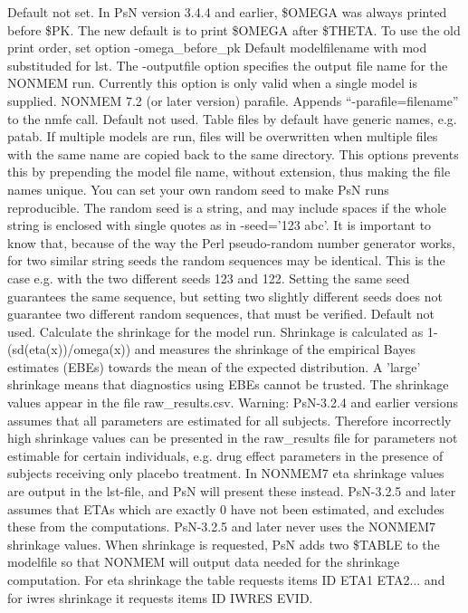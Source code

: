 \begin{optionlist}
\nextopt
{}
Default not set. In PsN version 3.4.4 and earlier, \$OMEGA was always printed before \$PK. The new default is to print \$OMEGA after \$THETA. To use the old print order, set option -omega\_before\_pk 
\nextopt
{}
Default modelfilename with mod substituded for lst. The -outputfile option specifies the output file name for the NONMEM run. Currently this option is only valid when a single model is supplied. 
\nextopt
{}
NONMEM 7.2 (or later version) parafile. Appends “-parafile=filename” to the nmfe call. 
\nextopt
{}
Default not used. Table files by default have generic names, e.g. patab. If multiple models are run, files will be overwritten when multiple files with the same name are copied back to the same directory. This options prevents this by prepending the model file name, without extension, thus making the file names unique. 
\nextopt
{}
You can set your own random seed to make PsN runs reproducible.
The random seed is a string, and may include spaces if the whole string is enclosed with single
quotes as in -seed='123 abc'. It is important to know that, because of the way the Perl pseudo-random
number generator works, for two similar string seeds the random sequences may be identical. 
This is the case e.g. with the two different seeds 123 and 122. 
Setting the same seed guarantees the same sequence, but setting two slightly different 
seeds does not guarantee two different random sequences, that must be verified.
\nextopt
{}
Default not used. Calculate the shrinkage for the model run.  Shrinkage is calculated as 1-(sd(eta(x))/omega(x)) and measures the shrinkage of the empirical Bayes estimates (EBEs) towards the mean of the expected distribution.  A 'large' shrinkage means that diagnostics using EBEs cannot be trusted. The shrinkage values appear in the file raw\_results.csv. Warning: PsN-3.2.4 and earlier versions assumes that all parameters are estimated for all subjects. Therefore incorrectly high shrinkage values can be presented in the raw\_results file for parameters not estimable for certain individuals, e.g. drug effect parameters in the presence of subjects receiving only placebo treatment. In NONMEM7 eta shrinkage values are output in the lst-file, and PsN will present these instead. PsN-3.2.5 and later assumes that ETAs which are exactly 0 have not been estimated, and excludes these from the computations. PsN-3.2.5 and later never uses the NONMEM7 shrinkage values. When shrinkage is requested, PsN adds two \$TABLE to the modelfile so that NONMEM will output data needed for the shrinkage computation. For eta shrinkage the table requests items ID ETA1 ETA2... and for iwres shrinkage it requests items ID IWRES EVID. 

\end{optionlist}
